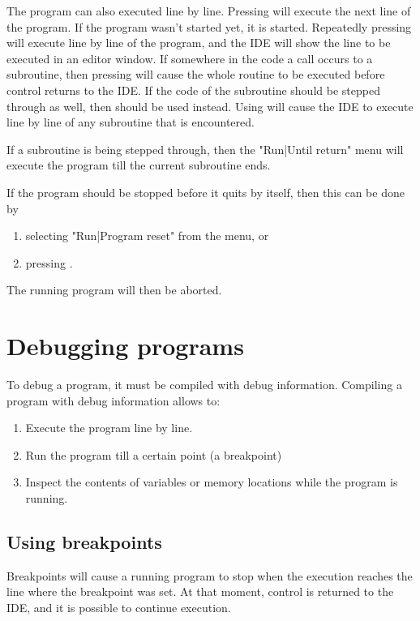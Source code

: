 The program can also executed line by line. Pressing  will 
execute the next line of the program. If the program wasn't started
yet, it is started. Repeatedly pressing  will execute line 
by line of the program, and the IDE will show the line to be executed 
in an editor window. If somewhere in the code a call occurs to a subroutine,
then pressing  will cause the whole routine to be executed before
control returns to the IDE. If the code of the subroutine should be stepped
through as well, then  should be used instead. Using  will
cause the IDE to execute line by line of any subroutine that is encountered.

If a subroutine is being stepped through, then the "Run|Until return" menu
will execute the program till the current subroutine ends. 

If the program should be stopped before it quits by itself, then this can be
done by
\begin{enumerate}
\item selecting "Run|Program reset" from the menu, or
\item pressing .
\end{enumerate}
The running program will then be aborted.

\section{Debugging programs}
\label{se:debugging}
To debug a program, it must be compiled with debug information. Compiling a
program with debug information allows to:
\begin{enumerate}
\item Execute the program line by line.
\item Run the program till a certain point (a breakpoint)
\item Inspect the contents of variables or memory locations while the
program is running.
\end{enumerate}

\subsection{Using breakpoints}
Breakpoints will cause a running program to stop when the execution
reaches the line where the breakpoint was set. At that moment, control
is returned to the IDE, and it is possible to continue execution.

